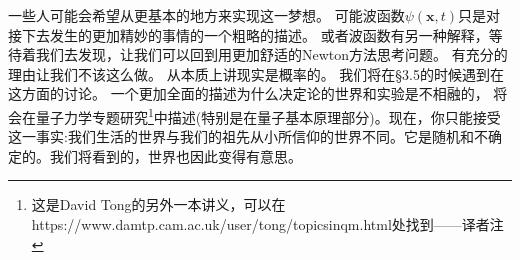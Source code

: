 一些人可能会希望从更基本的地方来实现这一梦想。 可能波函数$\psi(\mathbf{x},t)$只是对接下去发生的更加精妙的事情的一个粗略的描述。 或者波函数有另一种解释，等待着我们去发现，让我们可以回到用更加舒适的Newton方法思考问题。 有充分的理由让我们不该这么做。 从本质上讲现实是概率的。 我们将在\S 3.5的时候遇到在这方面的讨论。 一个更加全面的描述为什么决定论的世界和实验是不相融的， 将会在量子力学专题研究\footnote{这是David Tong的另外一本讲义，可以在https://www.damtp.cam.ac.uk/user/tong/topicsinqm.html处找到——译者注}中描述(特别是在量子基本原理部分)。现在，你只能接受这一事实:我们生活的世界与我们的祖先从小所信仰的世界不同。它是随机和不确定的。我们将看到的，世界也因此变得有意思。


